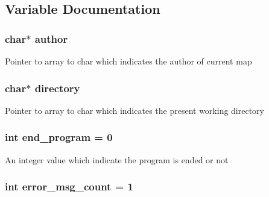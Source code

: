 \subsection{Variable Documentation}
\hypertarget{pacman-level-editor_8c_a70d51dcba75e5d70d4708c7885550468}{
\subsubsection[{author}]{\setlength{\rightskip}{0pt plus 5cm}char$\ast$ author}}\label{pacman-level-editor_8c_a70d51dcba75e5d70d4708c7885550468}
Pointer to array to char which indicates the author of current map \hypertarget{pacman-level-editor_8c_a8eadc6730ef4fbdae87a20414b789faf}{
\subsubsection[{directory}]{\setlength{\rightskip}{0pt plus 5cm}char$\ast$ directory}}\label{pacman-level-editor_8c_a8eadc6730ef4fbdae87a20414b789faf}
Pointer to array to char which indicates the present working directory \hypertarget{pacman-level-editor_8c_a1bee207ff2415ab72a1e22c86a93f100}{
\subsubsection[{end\-\_\-program}]{\setlength{\rightskip}{0pt plus 5cm}int end\-\_\-program = 0}}\label{pacman-level-editor_8c_a1bee207ff2415ab72a1e22c86a93f100}
An integer value which indicate the program is ended or not \hypertarget{pacman-level-editor_8c_ae0ebb9a2dde9db7a8070d03799386e18}{
\subsubsection[{error\-\_\-msg\-\_\-count}]{\setlength{\rightskip}{0pt plus 5cm}int error\-\_\-msg\-\_\-count = 1}}\label{pacman-level-editor_8c_ae0ebb9a2dde9db7a8070d03799386e18}
